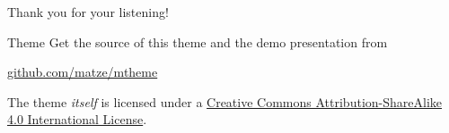 \documentclass[aspectratio=169, dvipdfmx, 11pt]{beamer}
\begin{document}
\begin{frame}
  Thank you for your listening!
\end{frame}

\begin{frame}[noframenumbering]{Theme}
  Get the source of this theme and the demo presentation from

  \begin{center}\url{github.com/matze/mtheme}\end{center}

  The theme \emph{itself} is licensed under a
  \href{http://creativecommons.org/licenses/by-sa/4.0/}{Creative Commons
    Attribution-ShareAlike 4.0 International License}.

  \begin{center}\ccbysa\end{center}
\end{frame}
\end{document}
